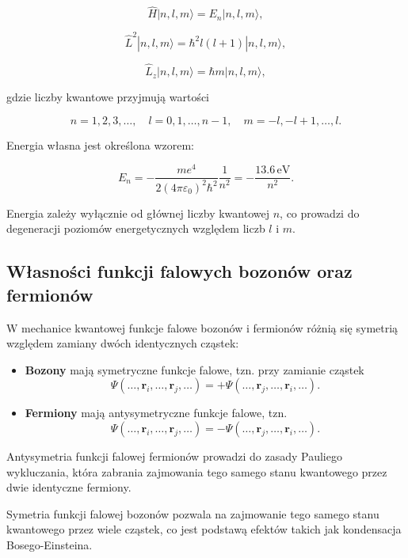\[
\hat{H}|n, l, m\rangle = E_n |n, l, m\rangle,
\]

\[
\hat{L}^2 |n, l, m\rangle = \hbar^2 l(l+1) |n, l, m\rangle,
\]

\[
\hat{L}_z |n, l, m\rangle = \hbar m |n, l, m\rangle,
\]

gdzie liczby kwantowe przyjmują wartości

\[
n = 1, 2, 3, \ldots, \quad l = 0, 1, \ldots, n-1, \quad m = -l, -l+1, \ldots, l.
\]

Energia własna jest określona wzorem:

\[
E_n = - \frac{m e^4}{2 (4 \pi \varepsilon_0)^2 \hbar^2} \frac{1}{n^2} = - \frac{13.6\,\mathrm{eV}}{n^2}.
\]

Energia zależy wyłącznie od głównej liczby kwantowej \(n\), co prowadzi do degeneracji poziomów energetycznych względem liczb \(l\) i \(m\).

\subsection{Własności funkcji falowych bozonów oraz fermionów}


W mechanice kwantowej funkcje falowe bozonów i fermionów różnią się symetrią względem zamiany dwóch identycznych cząstek:

\begin{itemize}
    \item \textbf{Bozony} mają symetryczne funkcje falowe, tzn. przy zamianie cząstek
    \[
    \Psi(\ldots, \mathbf{r}_i, \ldots, \mathbf{r}_j, \ldots) = + \Psi(\ldots, \mathbf{r}_j, \ldots, \mathbf{r}_i, \ldots).
    \]
    
    \item \textbf{Fermiony} mają antysymetryczne funkcje falowe, tzn.
    \[
    \Psi(\ldots, \mathbf{r}_i, \ldots, \mathbf{r}_j, \ldots) = - \Psi(\ldots, \mathbf{r}_j, \ldots, \mathbf{r}_i, \ldots).
    \]
\end{itemize}

Antysymetria funkcji falowej fermionów prowadzi do zasady Pauliego wykluczania, która zabrania zajmowania tego samego stanu kwantowego przez dwie identyczne fermiony.

Symetria funkcji falowej bozonów pozwala na zajmowanie tego samego stanu kwantowego przez wiele cząstek, co jest podstawą efektów takich jak kondensacja Bosego-Einsteina.
